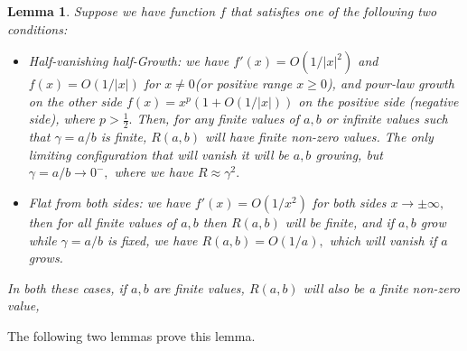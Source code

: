 \documentclass[11pt]{article}
\newtheorem{lemma}{Lemma}
\begin{document}
\begin{lemma}
    Suppose we have function $f$ that satisfies one of the following two conditions: 
    \begin{itemize}
        \item Half-vanishing half-Growth: we have  $f'(x) = O(1/|x|^2)$ and $f(x) = O(1/|x|)$ for $x\ne 0 $(or positive range $x\ge 0$), and powr-law growth on the other side $f(x) = x^p ( 1 + O(1/|x|))$  on the positive side (negative side), where $p > \frac12.$ Then, for any finite values of $a,b$ or infinite values such that $\gamma = a/b$ is finite, $R(a,b)$ will have finite non-zero values. The only limiting configuration that will vanish it will be $a,b$ growing, but $\gamma 
= a/b \to 0^-,$ where we have $R \approx \gamma^2.$
        \item Flat from both sides: we have $f'(x) = O(1/x^2) $ for both sides $x\to\pm\infty,$ then for all finite values of $a,b$ then $R(a,b)$ will be finite, and if $a,b$ grow while $\gamma = a/b$ is fixed, we have $R(a,b) = O( 1 /a  ),$ which will vanish if $a$ grows. 
    \end{itemize}
    In both these cases, if $a,b$ are finite values, $R(a,b)$ will also be a finite non-zero value, 
\end{lemma}

The following two lemmas prove this lemma. 
\end{document}
